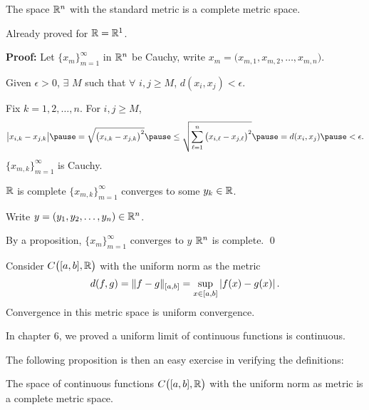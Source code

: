 \documentclass[10pt,aspectratio=169]{beamer}
\begin{document}
\begin{frame}

\begin{proposition}
The space ${\mathbb{R}}^n$ with the standard metric is a complete metric space.
\end{proposition}

\pause
Already proved for ${\mathbb{R}} = {\mathbb{R}}^1$.

\pause
\medskip

\textbf{Proof:}
Let $\{ x_m \}_{m=1}^\infty$ in ${\mathbb{R}}^n$ be Cauchy,
\pause
\quad write 
$x_m = \bigl(x_{m,1},x_{m,2},\ldots,x_{m,n}\bigr)$.

\pause
\medskip

Given $\epsilon > 0$, $\exists$ $M$ such that $\forall$
$i,j \geq M$,
\quad 
$d(x_i,x_j) < \epsilon$.

\pause
\medskip

Fix $k=1,2,\ldots,n$.
\pause
For $i,j \geq M$,
\[
\bigl\lvert x_{i,k} - x_{j,k} \bigr\rvert
\pause
=
\sqrt{{\bigl(x_{i,k} - x_{j,k}\bigr)}^2}
\pause
\leq
\sqrt{\sum_{\ell=1}^n {\bigl(x_{i,\ell}-x_{j,\ell}\bigr)}^2}
\pause
= d(x_i,x_j)
\pause
< \epsilon .
\]
\pause
\thus \quad
$\{ x_{m,k} \}_{m=1}^\infty$ is Cauchy.

\pause
\medskip

${\mathbb{R}}$ is complete
\pause
\wthus
$\{ x_{m,k} \}_{m=1}^\infty$ converges to some $y_k \in {\mathbb{R}}$.

\pause
\medskip

Write $y = (y_1,y_2,\ldots,y_n) \in {\mathbb{R}}^n$.

\pause
By a proposition, $\{ x_m \}_{m=1}^\infty$ converges
to $y$
\pause
\wthus ${\mathbb{R}}^n$ is complete.
\qed

\end{frame}

\begin{frame}

Consider $C\bigl([a,b],{\mathbb{R}}\bigr)$ with the uniform norm
as the metric
\[
d(f,g) = \lVert {f-g} \rVert_{[a,b]} = \sup_{x \in [a,b]} \left\lvert {f(x)-g(x)} \right\rvert .
\]
\pause
Convergence in this metric space is uniform convergence.

\medskip
\pause

In chapter 6, we proved a uniform limit of continuous
functions is continuous.

\medskip
\pause

The following proposition is then an easy exercise
in verifying the definitions:

\begin{proposition}
The space of continuous functions $C\bigl([a,b],{\mathbb{R}}\bigr)$ with the uniform
norm as metric is a complete metric space.
\end{proposition}

\end{frame}
\end{document}

